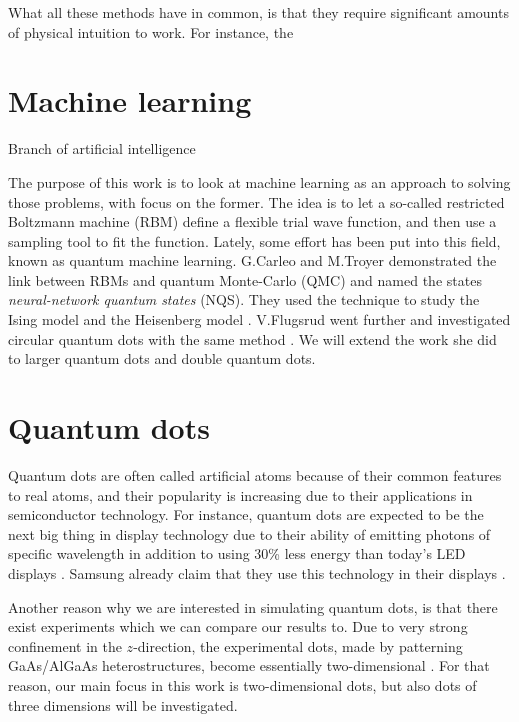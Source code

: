 What all these methods have in common, is that they require significant amounts of physical intuition to work. For instance, the 

\section{Machine learning} \label{sec:machinelearning}
Branch of artificial intelligence

The purpose of this work is to look at machine learning as an approach to solving those problems, with focus on the former. The idea is to let a so-called restricted Boltzmann machine (RBM) define a flexible trial wave function, and then use a sampling tool to fit the function. Lately, some effort has been put into this field, known as quantum machine learning. G.Carleo and M.Troyer demonstrated the link between RBMs and quantum Monte-Carlo (QMC) and named the states \textit{neural-network quantum states} (NQS). They used the technique to study the Ising model and the Heisenberg model \cite{carleo_solving_2017}. V.Flugsrud went further and investigated circular quantum dots with the same method \cite{flugsrud_vilde_moe_solving_nodate}. We will extend the work she did to larger quantum dots and double quantum dots.

\section{Quantum dots}
Quantum dots are often called artificial atoms because of their common features to real atoms, and their popularity is increasing due to their applications in semiconductor technology. For instance, quantum dots are expected to be the next big thing in display technology due to their ability of emitting photons of specific wavelength in addition to using 30\% less energy than today's LED displays \cite{manders_8.3:_2015}. Samsung already claim that they use this technology in their displays \cite{noauthor_2019_nodate}.

Another reason why we are interested in simulating quantum dots, is that there exist experiments which we can compare our results to. Due to very strong confinement in the $z$-direction, the experimental dots, made by patterning GaAs/AlGaAs heterostructures, become essentially two-dimensional \cite{marzin_photoluminescence_1994,brunner_sharp-line_1994}. For that reason, our main focus in this work is two-dimensional dots, but also dots of three dimensions will be investigated.

